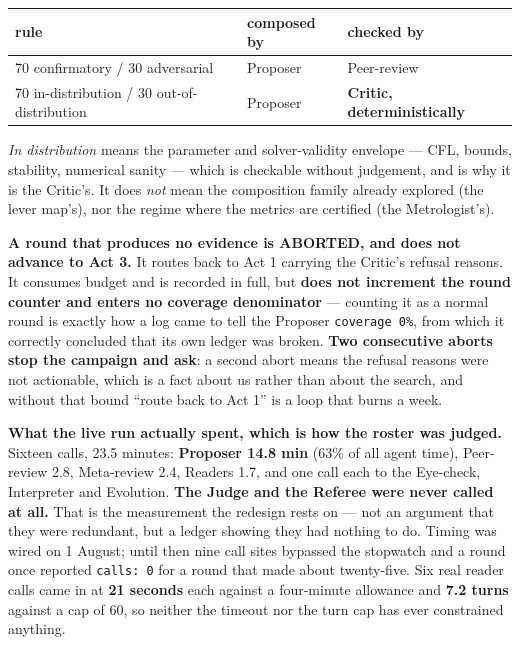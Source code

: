 \documentclass[11pt,a4paper]{article}
\newcommand{\code}[1]{\texttt{#1}}
\begin{document}
\begin{center}\small
\begin{tabular}{@{}l l l@{}}
\toprule
\textbf{rule} & \textbf{composed by} & \textbf{checked by}\\
\midrule
70 confirmatory / 30 adversarial & Proposer & Peer-review\\
70 in-distribution / 30 out-of-distribution & Proposer & \textbf{Critic, deterministically}\\
\bottomrule
\end{tabular}
\end{center}

\emph{In distribution} means the parameter and solver-validity envelope --- CFL, bounds, stability,
numerical sanity --- which is checkable without judgement, and is why it is the Critic's. It does
\emph{not} mean the composition family already explored (the lever map's), nor the regime where the
metrics are certified (the Metrologist's).

\vspace{4pt}
\textbf{A round that produces no evidence is ABORTED, and does not advance to Act 3.} It routes
back to Act 1 carrying the Critic's refusal reasons. It consumes budget and is recorded in full,
but \textbf{does not increment the round counter and enters no coverage denominator} --- counting
it as a normal round is exactly how a log came to tell the Proposer \code{coverage 0\%}, from which
it correctly concluded that its own ledger was broken. \textbf{Two consecutive aborts stop the
campaign and ask}: a second abort means the refusal reasons were not actionable, which is a fact
about us rather than about the search, and without that bound ``route back to Act 1'' is a loop
that burns a week.

\textbf{What the live run actually spent, which is how the roster was judged.} Sixteen calls,
23.5 minutes: \textbf{Proposer 14.8 min} (63\% of all agent time), Peer-review 2.8, Meta-review
2.4, Readers 1.7, and one call each to the Eye-check, Interpreter and Evolution. \textbf{The
Judge and the Referee were never called at all.} That is the measurement the redesign rests on ---
not an argument that they were redundant, but a ledger showing they had nothing to do. Timing was
wired on 1 August; until then nine call sites bypassed the stopwatch and a round once reported
\code{calls: 0} for a round that made about twenty-five. Six real reader calls came in at
\textbf{21 seconds} each against a four-minute allowance and \textbf{7.2 turns} against a cap of
60, so neither the timeout nor the turn cap has ever constrained anything.
\end{document}
